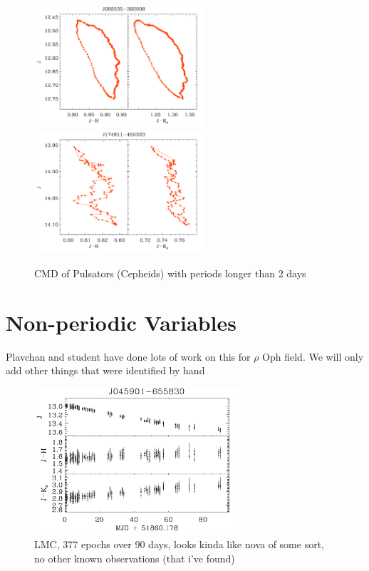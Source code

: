 \documentclass[]{emulateapj}
\begin{document}
\begin{figure}[]
\centering
\includegraphics[width=2.5in]{new_plots/rr_cmd_9}
\includegraphics[width=2.5in]{new_plots/rr_cmd_10}
\caption{CMD of Pulsators (Cepheids)  with periods longer than 2 days}
\label{cmdlong}
\end{figure}



\section{Non-periodic Variables}
Plavchan and student have done lots of work on this for $\rho$ Oph field. We will only add other things that were identified by hand



\begin{figure}[]
\centering
\includegraphics[width=3.0in]{new_plots/nova}
\caption{LMC, 377 epochs over 90 days, looks kinda like nova of some sort, no other known observations (that i've found)}
\label{nova}
\end{figure}
\end{document}
